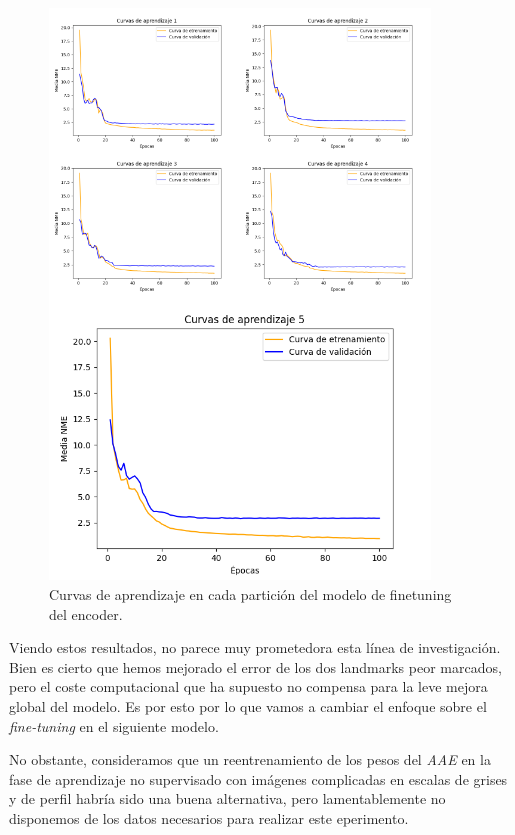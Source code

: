     \begin{figure}[H]
        \centering
        \includegraphics[width=0.9\textwidth]{img/curvas_encoder.png}
        \caption{Curvas de aprendizaje en cada partición del modelo de finetuning del encoder.}
        \label{fig:curvas_encoder}
    \end{figure}

    \medskip

    \noindent Viendo estos resultados, no parece muy prometedora esta línea de investigación. Bien es cierto que hemos mejorado el error de los dos landmarks peor marcados, pero el coste computacional que ha supuesto no compensa para la leve mejora global del modelo. Es por esto por lo que vamos a cambiar el enfoque sobre el \textit{fine-tuning} en el siguiente modelo. 
    
    \medskip
    
    \noindent No obstante, consideramos que un reentrenamiento de los pesos del \textit{AAE} en la fase de aprendizaje no supervisado con imágenes complicadas en escalas de grises y de perfil habría sido una buena alternativa, pero lamentablemente no disponemos de los datos necesarios para realizar este eperimento.
    
